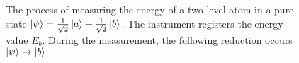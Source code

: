 \begin{figure}
\centering



\caption{The process of measuring the energy of a two-level atom in a pure state $\left|\psi\right> = 
\frac{1}{\sqrt{2}}\ket{a} + \frac{1}{\sqrt{2}}\ket{b}$.
The instrument registers the energy value $E_b$. During the measurement, the following reduction occurs $\left|\psi\right> \to \ket{b}$
}
\label{fig:add:mesure_ex_b}
\end{figure}